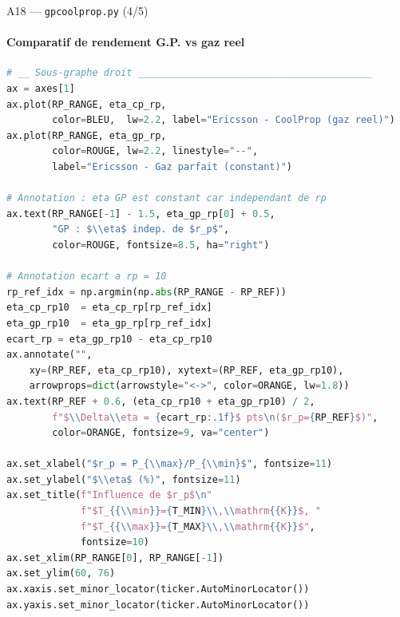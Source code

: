 \documentclass[aspectratio=43, 10pt]{beamer}
\begin{document}
\begin{frame}[fragile]{A18 --- \texttt{gpcoolprop.py} (4/5)}
  \framesubtitle{Comparatif de rendement G.P. vs gaz reel}
  \begin{exampleblock}{}
  \begin{lstlisting}[language=Python, basicstyle=\tiny\ttfamily]
# __ Sous-graphe droit _________________________________________
ax = axes[1]
ax.plot(RP_RANGE, eta_cp_rp,
        color=BLEU,  lw=2.2, label="Ericsson - CoolProp (gaz reel)")
ax.plot(RP_RANGE, eta_gp_rp,
        color=ROUGE, lw=2.2, linestyle="--",
        label="Ericsson - Gaz parfait (constant)")

# Annotation : eta GP est constant car independant de rp
ax.text(RP_RANGE[-1] - 1.5, eta_gp_rp[0] + 0.5,
        "GP : $\\eta$ indep. de $r_p$",
        color=ROUGE, fontsize=8.5, ha="right")

# Annotation ecart a rp = 10
rp_ref_idx = np.argmin(np.abs(RP_RANGE - RP_REF))
eta_cp_rp10  = eta_cp_rp[rp_ref_idx]
eta_gp_rp10  = eta_gp_rp[rp_ref_idx]
ecart_rp = eta_gp_rp10 - eta_cp_rp10
ax.annotate("",
    xy=(RP_REF, eta_cp_rp10), xytext=(RP_REF, eta_gp_rp10),
    arrowprops=dict(arrowstyle="<->", color=ORANGE, lw=1.8))
ax.text(RP_REF + 0.6, (eta_cp_rp10 + eta_gp_rp10) / 2,
        f"$\\Delta\\eta = {ecart_rp:.1f}$ pts\n($r_p={RP_REF}$)",
        color=ORANGE, fontsize=9, va="center")

ax.set_xlabel("$r_p = P_{\\max}/P_{\\min}$", fontsize=11)
ax.set_ylabel("$\\eta$ (%)", fontsize=11)
ax.set_title(f"Influence de $r_p$\n"
             f"$T_{{\\min}}={T_MIN}\\,\\mathrm{{K}}$, "
             f"$T_{{\\max}}={T_MAX}\\,\\mathrm{{K}}$",
             fontsize=10)
ax.set_xlim(RP_RANGE[0], RP_RANGE[-1])
ax.set_ylim(60, 76)
ax.xaxis.set_minor_locator(ticker.AutoMinorLocator())
ax.yaxis.set_minor_locator(ticker.AutoMinorLocator())
  \end{lstlisting}
  \end{exampleblock}
\end{frame}
\end{document}
